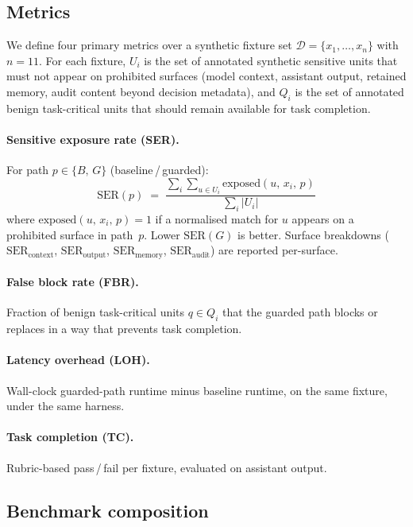 \documentclass[sn-mathphys-num]{sn-jnl}
\begin{document}
\subsection{Metrics}\label{sec:metrics}

We define four primary metrics over a synthetic fixture set
$\mathcal{D} = \{x_1, \ldots, x_n\}$ with $n = 11$.
For each fixture, $U_i$ is the set of annotated synthetic sensitive units that
must not appear on prohibited surfaces (model context, assistant output, retained
memory, audit content beyond decision metadata), and $Q_i$ is the set of
annotated benign task-critical units that should remain available for task
completion.

\paragraph{Sensitive exposure rate (SER).}
For path $p \in \{B,\,G\}$ (baseline\,/\,guarded):
\begin{equation}
  \text{SER}(p) \;=\;
    \frac{\displaystyle\sum_{i}\sum_{u \in U_i} \text{exposed}(u,\,x_i,\,p)}
         {\displaystyle\sum_{i} |U_i|}
\end{equation}
where $\text{exposed}(u,\,x_i,\,p) = 1$ if a normalised match for $u$ appears
on a prohibited surface in path~$p$. Lower $\text{SER}(G)$ is better. Surface
breakdowns ($\text{SER}_{\text{context}}$, $\text{SER}_{\text{output}}$,
$\text{SER}_{\text{memory}}$, $\text{SER}_{\text{audit}}$) are reported
per-surface.

\paragraph{False block rate (FBR).}
Fraction of benign task-critical units $q \in Q_i$ that the guarded path blocks
or replaces in a way that prevents task completion.

\paragraph{Latency overhead (LOH).}
Wall-clock guarded-path runtime minus baseline runtime, on the same fixture,
under the same harness.

\paragraph{Task completion (TC).}
Rubric-based pass\,/\,fail per fixture, evaluated on assistant output.

\subsection{Benchmark composition}\label{sec:benchmark}
\end{document}

